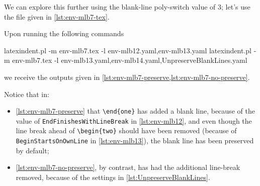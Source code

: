 \begin{example}
  \begin{cmhtcbraster}[ raster left skip=-3.5cm,
    raster right skip=-2cm,
    raster force size=false,
    raster column 1/.style={add to width=-.2\textwidth},
    raster column 2/.style={add to width=.2\textwidth},
    raster column skip=.06\linewidth]
  \end{cmhtcbraster}
  \end{example}

  \begin{example}
  We can explore this further using the blank-line poly-switch value of $3$; let's use the
  file given in \cref{lst:env-mlb7-tex}.


  Upon running the following commands  

  \begin{commandshell}
latexindent.pl -m env-mlb7.tex -l env-mlb12.yaml,env-mlb13.yaml
latexindent.pl -m env-mlb7.tex -l env-mlb13.yaml,env-mlb14.yaml,UnpreserveBlankLines.yaml
\end{commandshell}

  we receive the outputs given in \cref{lst:env-mlb7-preserve,lst:env-mlb7-no-preserve}.


  Notice that in:
  \begin{itemize}
   \item \cref{lst:env-mlb7-preserve} that \lstinline!\end{one}! has added a blank line,
         because of the value of \texttt{EndFinishesWithLineBreak} in \vref{lst:env-mlb12}, and
         even though the line break ahead of \lstinline!\begin{two}! should have been removed
         (because of \texttt{BeginStartsOnOwnLine} in \vref{lst:env-mlb13}), the blank line has
         been preserved by default;
   \item \cref{lst:env-mlb7-no-preserve}, by contrast, has had the additional line-break removed,
         because of the settings in \cref{lst:UnpreserveBlankLines}.
  \end{itemize}
  \end{example}

